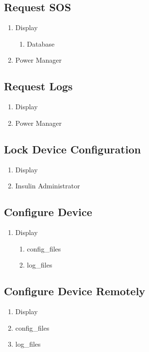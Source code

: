 \documentclass{scrreprt}
\begin{document}
\subsection{Request SOS}
\begin{enumerate}
    \item Display 
        \begin{enumerate}
            \item Database 
        \end{enumerate}
    \item Power Manager
\end{enumerate}

\subsection{Request Logs}
\begin{enumerate}
    \item Display 
    \item Power Manager
\end{enumerate}

\subsection{Lock Device Configuration}
\begin{enumerate}
    \item Display 
    \item Insulin Administrator
\end{enumerate}

\subsection{Configure Device}
\begin{enumerate}
    \item Display 
        \begin{enumerate}
            \item config\_files
            \item log\_files
        \end{enumerate}
\end{enumerate}

\subsection{Configure Device Remotely}
\begin{enumerate}
    \item Display 
            \item config\_files
            \item log\_files
\end{enumerate}
\end{document}
